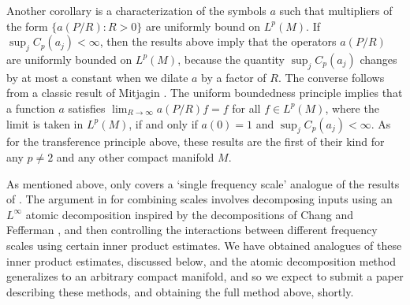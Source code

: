 \documentclass[11pt]{article}
\DeclareMathOperator{\RR}{\mathbb{R}}
\begin{document}
Another corollary is a characterization of the symbols $a$ such that multipliers of the form $\{ a(P/R) : R > 0 \}$ are uniformly bound on $L^p(M)$. If $\sup_j C_p(a_j) < \infty$, then the results above imply that the operators $a(P/R)$ are uniformly bounded on $L^p(M)$, because the quantity $\sup_j C_p(a_j)$ changes by at most a constant when we dilate $a$ by a factor of $R$. The converse follows from a classic result of Mitjagin \cite{Mitjagin}.
The uniform boundedness principle implies that a function $a$ satisfies $\lim_{R \to \infty} a(P/R) f = f$ for all $f \in L^p(M)$, where the limit is taken in $L^p(M)$, if and only if $a(0) = 1$ and $\sup_j C_p(a_j) < \infty$. As for the transference principle above, these results are the first of their kind for any $p \neq 2$ and any other compact manifold $M$.

As mentioned above, \cite{DensonCharacterization} only covers a `single frequency scale' analogue of the results of \cite{HeoNazarovSeeger}. The argument in \cite{HeoNazarovSeeger} for combining scales involves decomposing inputs using an $L^\infty$ atomic decomposition inspired by the decompositions of Chang and Fefferman \cite{ChangFefferman}, and then controlling the interactions between different frequency scales using certain inner product estimates. We have obtained analogues of these inner product estimates, discussed below, and the atomic decomposition method generalizes to an arbitrary compact manifold, and so we expect to submit a paper describing these methods, and obtaining the full method above, shortly.

\end{document}

